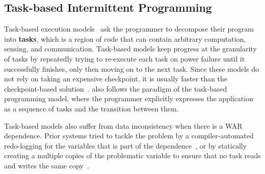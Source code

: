 \subsection{Task-based Intermittent Programming}
\label{section:background_task_computing}

Task-based execution models~\cite{dino,chain,alpaca} ask the programmer to
decompose their program into \textbf{tasks}, which is a region of code that can contain
arbitrary computation, sensing, and communication.  Task-based models keep
progress at the granularity of tasks by repeatedly trying to re-execute each
task on power failure until it successfully finishes, only then moving on to
the next task.  Since these models do not rely on taking an expensive
checkpoint, it is usually faster than the checkpoint-based
solution~\cite{chain, alpaca}.  \sys also follows the paradigm of the
task-based programming model, where the programmer explicitly expresses the
application as a sequence of tasks and the transition between them.

Task-based models also suffer from data inconsistency when there is a WAR
dependence.  Prior systems tried to tackle the problem by a compiler-automated
redo-logging for the variables that is part of the dependence~\cite{alpaca}, or
by statically creating a multiple copies of the problematic variable to ensure
that no task reads and writes the same copy~\cite{chain}.

